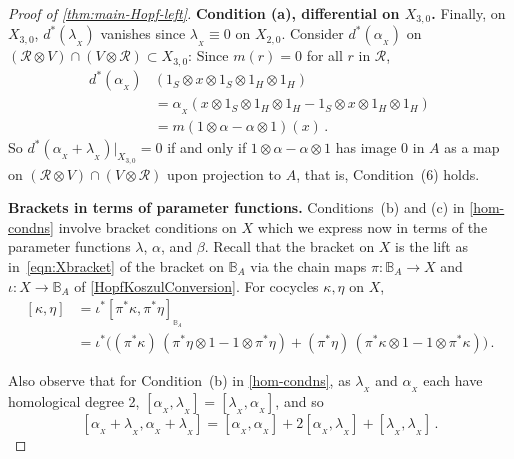 \documentclass[11pt]{amsart}
\numberwithin{equation}{section}
\newcommand{\X}{_X}
\newcommand{\alphax}{\alpha_{\X}}
\newcommand{\lambdax}{\lambda_{\X}}
\newcommand{\gammax}{\kappa} %
\newcommand{\etax}{\eta}
\newcommand{\R}{\mathcal{R}}
\newcommand{\BB}{\mathbb{B}} %
\renewcommand{\_}[1]{\mbox{$_{\left( #1 \right)}$}}
\newcommand{\ot}{\otimes}
\begin{document}
{\begin{proof}[Proof of \cref{thm:main-Hopf-left}]
{\bf Condition (a), differential on $X_{3,0}$.}
Finally, 
on $X_{3,0}$, $d^*(\lambdax)$ vanishes since $\lambdax\equiv 0$
on $X_{2,0}$.
Consider $d^*(\alphax)$ on  $(\R\ot V)\cap (V\ot \R)\subset X_{3,0}$:
Since $m(r)=0$ for all $r$ in $\R$,
\begin{equation}\label{image}
  \begin{aligned}
 d^*(\alphax) &(1_S\ot x\ot 1_S\ot 1_H\ot 1_H)\\
 &=  \alphax (x\ot 1_S\ot 1_H\ot 1_H - 1_S\ot x\ot 1_H\ot 1_H)\\
 &=  m(1\ot \alpha-\alpha\ot 1)(x)
 \,  .
\end{aligned}
\end{equation}
So $d^*(\alphax + \lambdax)|_{X_{3,0}}= 0$ if and only if
$ 1\ot \alpha - \alpha\ot 1$ has image $0$ in $A$
as a map on $(\R\ot V)\cap (V\ot \R)$ upon projection to $A$, that is,
Condition~(6) holds.



{\bf Brackets in terms of parameter functions.}
Conditions~(b) and (c) in \cref{hom-condns}
involve bracket conditions on $X$
which we express now in terms of the parameter
functions $\lambda$, $\alpha$, and $\beta$.
%
   Recall that 
   the bracket on $X$ is the lift
   as  
   in~\cref{eqn:Xbracket} of the bracket
   on $\BB_A$
   via the chain maps $\pi:\BB_A\rightarrow 
   X$ and $\iota:X\rightarrow \BB_A$ 
of \cref{HopfKoszulConversion}.
For cocycles $\gammax, \etax$ on $X$,
\begin{equation}\label{BracketDefinition}
  \begin{aligned}
    [\gammax, \etax]
    &=\iota^*[\pi^*\gammax,  \pi^*\etax]_{_{\BB_{\! A} }}\,
    \\ &=
   \iota^*\Big(
   (\pi^*\gammax)\, (\pi^*\etax\ot 1 - 1\ot \pi^*\etax) 
   +
   (\pi^*\etax)\, (\pi^*\gammax\ot 1 - 1\ot \pi^*\gammax)\Big)
   \, .
   \end{aligned}
 \end{equation}
 
 
 Also observe that for Condition~(b) in \cref{hom-condns},
 as
 $\lambdax$ and $\alphax$ each have homological 
degree 2, 
$[\alphax,\lambdax]=[\lambdax,\alphax]$, and so 
\[
  [\alphax + \lambdax, \alphax +\lambdax]
  =[\alphax,\alphax]+2[\alphax,\lambdax]+[\lambdax,\lambdax]
  \, .
\]   


\end{proof}}
\end{document}
